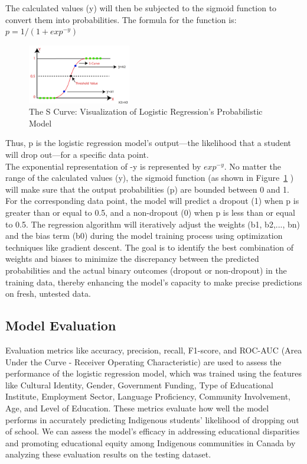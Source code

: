 \documentclass[final,12p,twocolumn]{article}
\begin{document}
The calculated values (y) will then be subjected to the sigmoid function to convert them into probabilities. The formula for the function is: $ p = 1 / (1 + {exp^{-y}}) $\\

\begin{figure}
	\centering 
	\includegraphics[width=0.4\textwidth, angle=0]{images/Picture3.png}	
	\caption{The S Curve: Visualization of Logistic Regression's Probabilistic Model} 
	\label{fig_mom0}
\end{figure}

Thus, p is the logistic regression model's output—the likelihood that a student will drop out—for a specific data point.\\
The exponential representation of -y is represented by ${exp^{-y}}$.
No matter the range of the calculated values (y), the sigmoid function (as shown in Figure~\ref{fig_mom0} \cite{r19}) will make sure that the output probabilities (p) are bounded between 0 and 1. For the corresponding data point, the model will predict a dropout (1) when p is greater than or equal to 0.5, and a non-dropout (0) when p is less than or equal to 0.5.
The regression algorithm will iteratively adjust the weights (b1, b2,..., bn) and the bias term (b0) during the model training process using optimization techniques like gradient descent. The goal is to identify the best combination of weights and biases to minimize the discrepancy between the predicted probabilities and the actual binary outcomes (dropout or non-dropout) in the training data, thereby enhancing the model's capacity to make precise predictions on fresh, untested data.

\subsection{\textbf{Model Evaluation}}
Evaluation metrics like accuracy, precision, recall, F1-score, and ROC-AUC (Area Under the Curve - Receiver Operating Characteristic) are used to assess the performance of the logistic regression model, which was trained using the features like Cultural Identity, Gender, Government Funding, Type of Educational Institute, Employment Sector, Language Proficiency, Community Involvement, Age, and Level of Education. These metrics evaluate how well the model performs in accurately predicting Indigenous students' likelihood of dropping out of school. We can assess the model's efficacy in addressing educational disparities and promoting educational equity among Indigenous communities in Canada by analyzing these evaluation results on the testing dataset.
\end{document}
